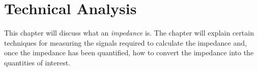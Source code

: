 \chapter{Technical Analysis} \label{ch:TechnicalAnalysis}
This chapter will discuss what an \textit{impedance} is. The chapter will explain certain techniques for measuring the signals required to calculate the impedance and, once the impedance has been quantified, how to convert the impedance into the quantities of interest.



